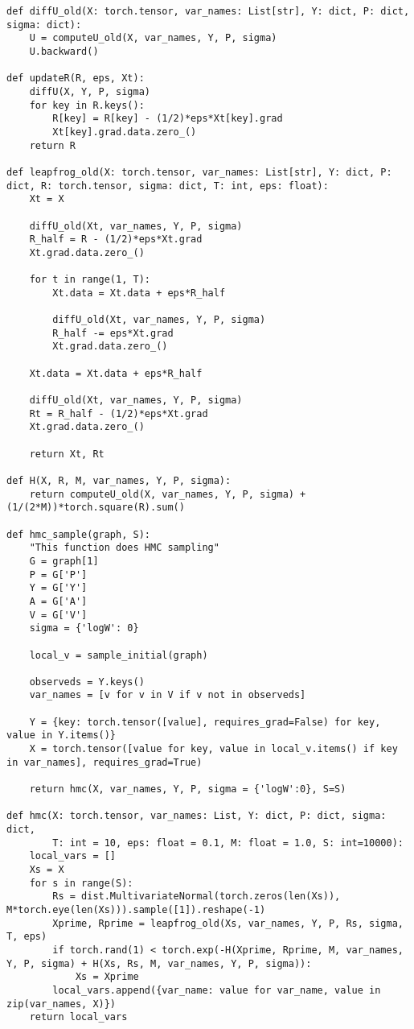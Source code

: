 \documentclass[11pt]{article}
\begin{document}
{{\begin{verbatim}
def diffU_old(X: torch.tensor, var_names: List[str], Y: dict, P: dict, sigma: dict):
    U = computeU_old(X, var_names, Y, P, sigma)
    U.backward()

def updateR(R, eps, Xt):
    diffU(X, Y, P, sigma)
    for key in R.keys():
        R[key] = R[key] - (1/2)*eps*Xt[key].grad
        Xt[key].grad.data.zero_()
    return R

def leapfrog_old(X: torch.tensor, var_names: List[str], Y: dict, P: dict, R: torch.tensor, sigma: dict, T: int, eps: float):
    Xt = X

    diffU_old(Xt, var_names, Y, P, sigma)
    R_half = R - (1/2)*eps*Xt.grad
    Xt.grad.data.zero_()

    for t in range(1, T):
        Xt.data = Xt.data + eps*R_half

        diffU_old(Xt, var_names, Y, P, sigma)
        R_half -= eps*Xt.grad
        Xt.grad.data.zero_()

    Xt.data = Xt.data + eps*R_half

    diffU_old(Xt, var_names, Y, P, sigma)
    Rt = R_half - (1/2)*eps*Xt.grad
    Xt.grad.data.zero_()

    return Xt, Rt

def H(X, R, M, var_names, Y, P, sigma):
    return computeU_old(X, var_names, Y, P, sigma) + (1/(2*M))*torch.square(R).sum()

def hmc_sample(graph, S):
    "This function does HMC sampling"
    G = graph[1]
    P = G['P']
    Y = G['Y']
    A = G['A']
    V = G['V']
    sigma = {'logW': 0}

    local_v = sample_initial(graph)

    observeds = Y.keys()
    var_names = [v for v in V if v not in observeds]

    Y = {key: torch.tensor([value], requires_grad=False) for key, value in Y.items()}
    X = torch.tensor([value for key, value in local_v.items() if key in var_names], requires_grad=True)

    return hmc(X, var_names, Y, P, sigma = {'logW':0}, S=S)

def hmc(X: torch.tensor, var_names: List, Y: dict, P: dict, sigma: dict,
        T: int = 10, eps: float = 0.1, M: float = 1.0, S: int=10000):
    local_vars = []
    Xs = X
    for s in range(S):
        Rs = dist.MultivariateNormal(torch.zeros(len(Xs)), M*torch.eye(len(Xs))).sample([1]).reshape(-1)
        Xprime, Rprime = leapfrog_old(Xs, var_names, Y, P, Rs, sigma, T, eps)
        if torch.rand(1) < torch.exp(-H(Xprime, Rprime, M, var_names, Y, P, sigma) + H(Xs, Rs, M, var_names, Y, P, sigma)):
            Xs = Xprime
        local_vars.append({var_name: value for var_name, value in zip(var_names, X)})
    return local_vars


\end{verbatim}}}
\end{document}
